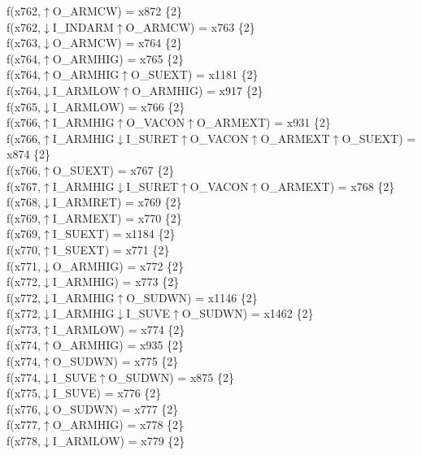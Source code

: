 f(x762,$\uparrow$O\_ARMCW) = x872 \{2\} \\  
f(x762,$\downarrow$I\_INDARM$\uparrow$O\_ARMCW) = x763 \{2\} \\  
f(x763,$\downarrow$O\_ARMCW) = x764 \{2\} \\  
f(x764,$\uparrow$O\_ARMHIG) = x765 \{2\} \\  
f(x764,$\uparrow$O\_ARMHIG$\uparrow$O\_SUEXT) = x1181 \{2\} \\  
f(x764,$\downarrow$I\_ARMLOW$\uparrow$O\_ARMHIG) = x917 \{2\} \\  
f(x765,$\downarrow$I\_ARMLOW) = x766 \{2\} \\  
f(x766,$\uparrow$I\_ARMHIG$\uparrow$O\_VACON$\uparrow$O\_ARMEXT) = x931 \{2\} \\  
f(x766,$\uparrow$I\_ARMHIG$\downarrow$I\_SURET$\uparrow$O\_VACON$\uparrow$O\_ARMEXT$\uparrow$O\_SUEXT) = x874 \{2\} \\  
f(x766,$\uparrow$O\_SUEXT) = x767 \{2\} \\  
f(x767,$\uparrow$I\_ARMHIG$\downarrow$I\_SURET$\uparrow$O\_VACON$\uparrow$O\_ARMEXT) = x768 \{2\} \\  
f(x768,$\downarrow$I\_ARMRET) = x769 \{2\} \\  
f(x769,$\uparrow$I\_ARMEXT) = x770 \{2\} \\  
f(x769,$\uparrow$I\_SUEXT) = x1184 \{2\} \\  
f(x770,$\uparrow$I\_SUEXT) = x771 \{2\} \\  
f(x771,$\downarrow$O\_ARMHIG) = x772 \{2\} \\  
f(x772,$\downarrow$I\_ARMHIG) = x773 \{2\} \\  
f(x772,$\downarrow$I\_ARMHIG$\uparrow$O\_SUDWN) = x1146 \{2\} \\  
f(x772,$\downarrow$I\_ARMHIG$\downarrow$I\_SUVE$\uparrow$O\_SUDWN) = x1462 \{2\} \\  
f(x773,$\uparrow$I\_ARMLOW) = x774 \{2\} \\  
f(x774,$\uparrow$O\_ARMHIG) = x935 \{2\} \\  
f(x774,$\uparrow$O\_SUDWN) = x775 \{2\} \\  
f(x774,$\downarrow$I\_SUVE$\uparrow$O\_SUDWN) = x875 \{2\} \\  
f(x775,$\downarrow$I\_SUVE) = x776 \{2\} \\  
f(x776,$\downarrow$O\_SUDWN) = x777 \{2\} \\  
f(x777,$\uparrow$O\_ARMHIG) = x778 \{2\} \\  
f(x778,$\downarrow$I\_ARMLOW) = x779 \{2\} \\  
